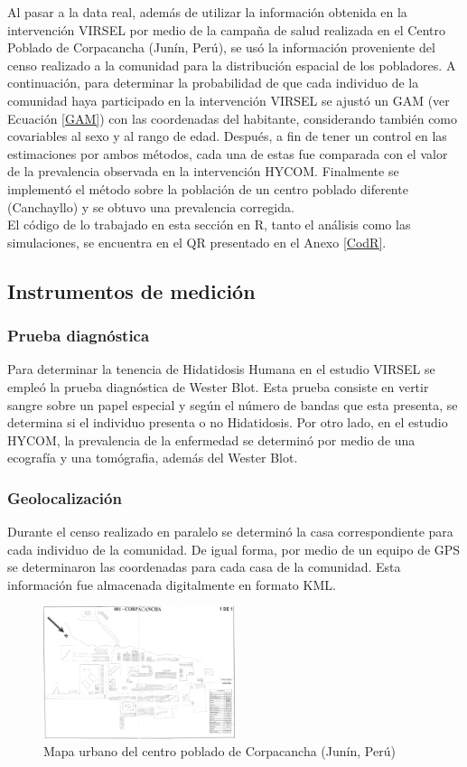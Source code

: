 Al pasar a la data real, además de utilizar la información obtenida en la intervención VIRSEL por medio de la campaña de salud realizada en el Centro Poblado de Corpacancha (Junín, Perú), se usó la información proveniente del censo realizado a la comunidad para la distribución espacial de los pobladores. A continuación, para determinar la probabilidad de que cada individuo de la comunidad haya participado en la intervención VIRSEL se ajustó un GAM (ver Ecuación \ref{GAM}) con las coordenadas del habitante, considerando también como covariables al sexo y al rango de edad. Después, a fin de tener un control en las estimaciones por ambos métodos, cada una de estas fue comparada con el valor de la prevalencia observada en la intervención HYCOM. Finalmente se implementó el método sobre la población de un centro poblado diferente (Canchayllo) y se obtuvo una prevalencia corregida.\\
El código de lo trabajado en esta sección en R, tanto el análisis como las simulaciones, se encuentra en el QR presentado en el Anexo \ref{CodR}.
\subsection{Instrumentos de medición}
\subsubsection*{Prueba diagnóstica}
Para determinar la tenencia de Hidatidosis Humana en el estudio VIRSEL se empleó la prueba diagnóstica de Wester Blot. Esta prueba consiste en vertir sangre sobre un papel especial y según el número de bandas que esta presenta, se determina si el individuo presenta o no Hidatidosis. Por otro lado, en el estudio HYCOM, la prevalencia de la enfermedad se determinó por medio de una ecografía y una tomógrafia, además del Wester Blot. 
\newpage
\subsubsection*{Geolocalización}
Durante el censo realizado en paralelo se determinó la casa correspondiente para cada individuo de la comunidad. De igual forma, por medio de un equipo de GPS se determinaron las coordenadas para cada casa de la comunidad. Esta información fue almacenada digitalmente en formato KML.
\begin{figure}[h]
\centering
\includegraphics[width=0.5\textwidth]{imagenes/corpacancha_mapa.png} %
\caption{Mapa urbano del centro poblado de Corpacancha (Junín, Perú)}
\end{figure}

